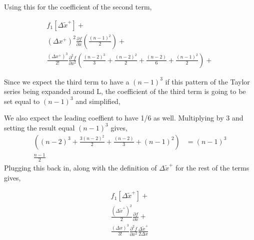 \documentclass[12pt]{article}
\begin{document}
Using this for the coefficient of the second term,

\begin{align*}
     f_1\left[ \Delta \widetilde{x}^+  \right] + \\
    (\Delta x^+)^2 \frac{\partial f}{\partial x } \left(
    \frac{(n-1)^2}{2}  \right) + \\
        \frac{(\Delta x^+)^3}{2!} \frac{\partial^2 f}{\partial x^2 } \left(
        \frac{(n-2)^3}{3} + \frac{(n-2)^2}{2} + \frac{(n-2)}{6} + \frac{(n-1)^2}{2} \right)  +
\end{align*}

Since we expect the third term to have a $\left( n-1 \right)^3$ if this pattern
of the Taylor series being expanded around L, the coefficient of the third term
is going to be set equal to $\left( n-1 \right)^3$ and simplified,

We also expect the leading coeffient to have 1/6 as well. Multiplying by 3
and setting the result equal $(n-1)^3$ gives,
\begin{align*}
    \left(
    (n-2)^3 + \frac{3(n-2)^2}{2} + \frac{(n-2)}{3} + (n-1)^2 
    \right)
    &=
    (n-1)^3 \\
    \frac{n-1}{2}
\end{align*}
Plugging this back in, along with the definition of $\Delta \widetilde{x}^+$ for
the rest of the terms gives,


\begin{align*}
     f_1\left[ \Delta \widetilde{x}^+  \right] + \\
 \frac{(\Delta \widetilde{x}^+)^2}{2}     \frac{\partial f}{\partial x }  + \\
 \frac{(\Delta x)^3}{3!} \frac{\partial^2 f}{\partial x^2 } 
 \frac{ \Delta \widetilde{x}^+
 }{2\Delta x}
 \end{align*}
\end{document}
